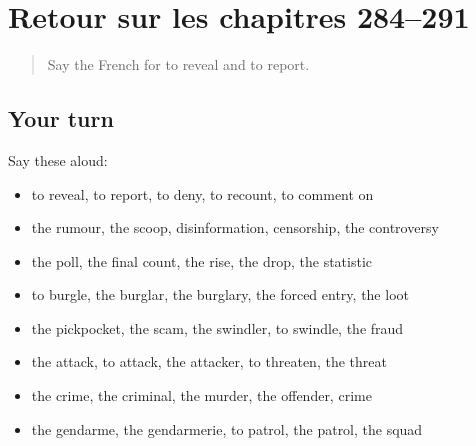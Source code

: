 \section[(dialogue)]{Retour sur les chapitres 284–291}

\label{lesson:FR-R291-revision-284-291}



\begin{quote}
Say the French for to reveal and to report.
\end{quote}

\subsection*{Your turn}
Say these aloud:

\begin{itemize}
\raggedright
  \item to reveal, to report, to deny, to recount, to comment on
  \item the rumour, the scoop, disinformation, censorship, the controversy
  \item the poll, the final count, the rise, the drop, the statistic
  \item to burgle, the burglar, the burglary, the forced entry, the loot
  \item the pickpocket, the scam, the swindler, to swindle, the fraud
  \item the attack, to attack, the attacker, to threaten, the threat
  \item the crime, the criminal, the murder, the offender, crime
  \item the gendarme, the gendarmerie, to patrol, the patrol, the squad
\end{itemize}

